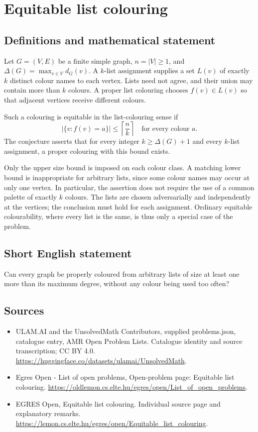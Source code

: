 \documentclass[11pt,a4paper]{article}
\begin{document}
\section*{Equitable list colouring}\label{statement}

\subsection{Definitions and mathematical statement}
Let $G=(V,E)$ be a finite simple graph, $n=|V|\ge1$, and
$\Delta(G)=\max_{v\in V}d_G(v)$. A $k$-list assignment supplies a set
$L(v)$ of exactly $k$ distinct colour names to each vertex. Lists
need not agree, and their union may contain more than $k$ colours.
A proper list colouring chooses $f(v)\in L(v)$ so that adjacent
vertices receive different colours.

Such a colouring is equitable in the list-colouring sense if
\[
                       |\{v:f(v)=a\}|\le\left\lceil\frac nk\right\rceil
                                      \quad\text{for every colour }a.
\]
The conjecture asserts that for every integer $k\ge\Delta(G)+1$ and
every $k$-list assignment, a proper colouring with this bound exists.

Only the upper size bound is imposed on each colour class. A matching
lower bound is inappropriate for arbitrary lists, since some colour
names may occur at only one vertex. In particular, the assertion does
not require the use of a common palette of exactly $k$ colours.
The lists are chosen adversarially and independently at the vertices;
the conclusion must hold for each assignment. Ordinary equitable
colourability, where every list is the same, is thus only a special
case of the problem.
\subsection{Short English statement}
Can every graph be properly coloured from arbitrary lists of
size at least one more than its maximum degree, without any colour being used too often?
\subsection{Sources}
\begin{itemize}
\item[S1] ULAM.AI and the UnsolvedMath Contributors, supplied problems.json, catalogue entry, AMR Open Problem Lists. Catalogue identity and source transcription; CC BY 4.0.
\url{https://huggingface.co/datasets/ulamai/UnsolvedMath}.
\item[S2] Egres Open - List of open problems, Open-problem page: Equitable list colouring. 
\url{https://oldlemon.cs.elte.hu/egres/open/List_of_open_problems}.
\item[S3] EGRES Open, Equitable list colouring. Individual source page and explanatory remarks.
\url{https://lemon.cs.elte.hu/egres/open/Equitable_list_colouring}.
\end{itemize}
\end{document}
